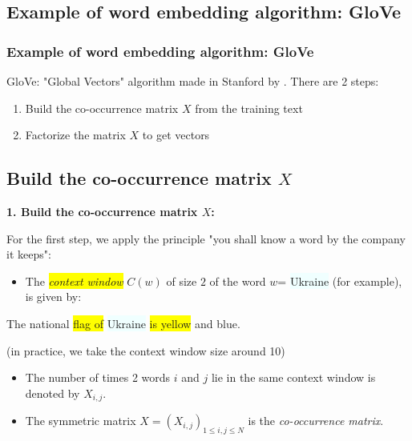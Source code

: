 \documentclass{beamer}
\begin{document}
\begin{frame}

\section{Example of word embedding algorithm: GloVe}

\frametitle{Example of word embedding algorithm: GloVe}

GloVe: "Global Vectors" algorithm made in Stanford by \cite{pennington14}. There are 2 steps:

\begin{enumerate}
\item Build the co-occurrence matrix $X$ from the training text
\item Factorize the matrix $X$ to get vectors
\end{enumerate}


\bigskip

\subsection{Build the co-occurrence matrix $X$}

\textbf{1. Build the co-occurrence matrix $X$:} 

For the first step, we apply the principle "you shall know a word by the company it keeps": 

\end{frame}

\begin{frame}

\begin{itemize}
\item The \colorbox{yellow}{\textit{context window}} $C(w)$ of size $2$ of the word $w$= \colorbox{azure}{Ukraine}  (for example), is given by: 
\end{itemize}

\begin{center}
The national \colorbox{yellow}{flag of} \colorbox{azure}{Ukraine} \colorbox{yellow}{is yellow} and blue.
\end{center}

(in practice, we take the context window size around 10)


\bigskip

\begin{itemize}
\item The number of times 2 words $i$ and $j$ lie in the same context window is denoted by $X_{i,j}$. 
\item The symmetric matrix $X=(X_{i,j})_{1 \leq i,j \leq N}$ is the \textit{co-occurrence matrix}.

\end{itemize}

\end{frame}
\end{document}
